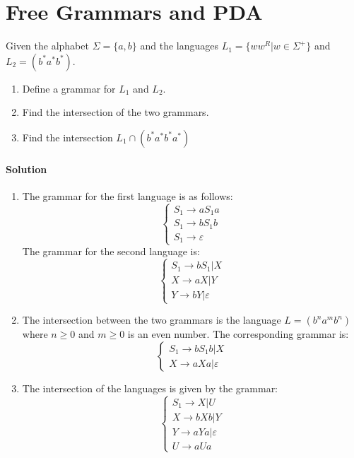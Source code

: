 \section{Free Grammars and PDA}

Given the alphabet $\Sigma=\{a,b\}$ and the languages $L_1=\{ww^R|w \in \Sigma^{+}\}$ and $L_2=(b^{*}a^{*}b^{*})$.
\begin{enumerate}
    \item Define a grammar for $L_1$ and $L_2$. 
    \item Find the intersection of the two grammars. 
    \item Find the intersection $L_1 \cap (b^{*}a^{*}b^{*}a^{*})$
\end{enumerate}

\paragraph*{Solution}
\begin{enumerate}
\item The grammar for the first language is as follows:
    \[\begin{cases}
        S_1 \rightarrow aS_1a           \\
        S_1 \rightarrow bS_1b           \\
        S_1 \rightarrow \varepsilon
    \end{cases}\]
    The grammar for the second language is: 
    \[\begin{cases}
        S_1 \rightarrow bS_1|X          \\
        X \rightarrow aX|Y              \\
        Y \rightarrow bY|\varepsilon
    \end{cases}\]
\item The intersection between the two grammars is the language $L=(b^na^mb^n)$ where $n \geq 0$ and $m \geq 0$ is an even number. 
    The corresponding grammar is: 
    \[\begin{cases}
        S_1 \rightarrow bS_1b | X \\
        X \rightarrow aXa | \varepsilon
    \end{cases}\]
\item The intersection of the languages is given by the grammar:
    \[\begin{cases}
        S_1 \rightarrow X | U               \\
        X \rightarrow bXb | Y               \\
        Y \rightarrow aYa | \varepsilon     \\
        U \rightarrow aUa   
    \end{cases}\]
\end{enumerate}